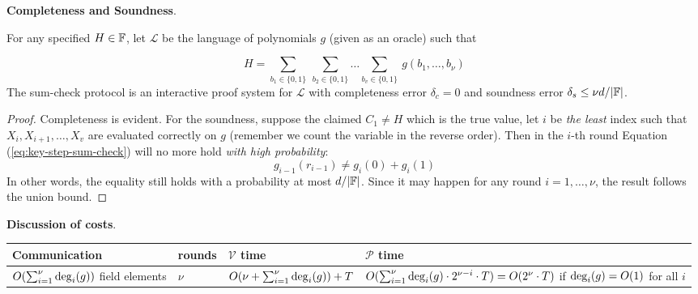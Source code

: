 \documentclass{article}
\begin{document}
\textbf{Completeness and Soundness}. 

\begin{boxx2}
For any specified $H \in \mathbb{F}$, let $\mathcal{L}$ be the language of polynomials $g$ (given as an oracle) such that

\begin{equation*}
H = \sum_{b_1 \in \{0, 1\}} \:  \sum_{b_2 \in \{0, 1 \}} \dots  \sum_{b_v \in \{0, 1 \}} \: g(b_1, \dots, b_{\nu})
\end{equation*}
The sum-check protocol is an interactive proof system for $\mathcal{L}$ with completeness error $\delta_c = 0$ and soundness error $\delta_s \leq \nu d / |\mathbb{F}|$.
\end{boxx2}

\begin{proof}
Completeness is evident. For the soundness, suppose the claimed $C_1 \neq H$ which is the true value, let $i$ be \textit{the least} index such that $X_{i}, X_{i+1}, \dots, X_v$ are evaluated correctly on $g$ (remember we count the variable in the reverse order). Then in the $i$-th round Equation (\ref{eq:key-step-sum-check}) will no more hold \textit{with high probability}:
\begin{equation*}
g_{i-1}(r_{i-1}) \neq g_{i}(0) + g_{i}(1)
\end{equation*}
In other words, the equality still holds with a probability at most $d/|\mathbb{F}|$. Since it may happen for any round $i = 1, \dots, \nu$, the result follows the union bound. 
\end{proof}

\textbf{Discussion of costs}. 
\begin{center}
\begin{tabular} { | m{5cm} | m{1cm} | m{4cm} | m{5cm} | }
\hline
Communication        & rounds   & $\mathcal{V}$ time  & $\mathcal{P}$ time \\
\hline
$O(\sum_{i = 1}^{\nu} \operatorname{deg}_i(g))$ field elements  & $\nu$  & $ O(\nu + \sum_{i = 1}^{\nu} \operatorname{deg}_i(g)) + T$ & $ O(\sum_{i=1}^{\nu} \operatorname{deg}_i(g) \cdot 2^{\nu - i} \cdot T) = O(2^{\nu} \cdot T)$ if $\operatorname{deg}_i(g) = O(1)$ for all $i$ \\
\hline
\end{tabular}
\end{center}
\end{document}
